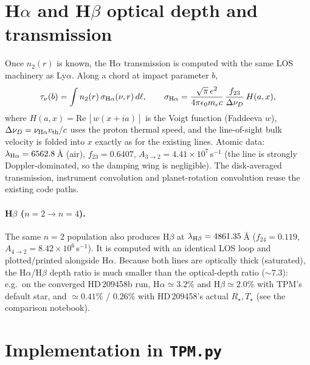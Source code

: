 \documentclass[english,a4paper]{kiseon_memo}
\begin{document}
\section{H$\alpha$ and H$\beta$ optical depth and transmission}

Once $n_2(r)$ is known, the H$\alpha$ transmission is computed with the
same LOS machinery as Ly$\alpha$. Along a chord at impact parameter $b$,
\[
  \tau_\nu(b) = \int n_2(r)\,\sigma_{\rm H\alpha}(\nu,r)\,d\ell,
  \qquad
  \sigma_{\rm H\alpha} = \frac{\sqrt{\pi}\,e^2}{4\pi\epsilon_0 m_e c}\,
  \frac{f_{23}}{\Delta\nu_D}\,H(a,x),
\]
where $H(a,x)=\mathrm{Re}\,[w(x+ia)]$ is the Voigt function (Faddeeva
$w$), $\Delta\nu_D=\nu_{\rm H\alpha}v_{\rm th}/c$ uses the proton thermal
speed, and the line-of-sight bulk velocity is folded into $x$ exactly as
for the existing lines. Atomic data: $\lambda_{\rm H\alpha}=6562.8\,$\AA{}
(air), $f_{23}=0.6407$, $A_{3\to2}=4.41\times10^{7}\,$s$^{-1}$ (the line
is strongly Doppler-dominated, so the damping wing is negligible). The
disk-averaged transmission, instrument convolution and planet-rotation
convolution reuse the existing code paths.

\paragraph{H$\beta$ ($n=2\to n=4$).} The same $n=2$ population also
produces H$\beta$ at $\lambda_{\rm H\beta}=4861.35\,$\AA{} ($f_{24}=0.119$,
$A_{4\to2}=8.42\times10^{6}\,$s$^{-1}$). It is computed with an identical
LOS loop and plotted/printed alongside H$\alpha$. Because both lines are
optically thick (saturated), the H$\alpha$/H$\beta$ depth ratio is much
smaller than the optical-depth ratio ($\sim7.3$): e.g.\ on the converged
HD\,209458b run, H$\alpha\simeq3.2\%$ and H$\beta\simeq2.0\%$ with TPM's
default star, and $\simeq0.41\%$ / $0.26\%$ with HD\,209458's actual
$R_\star,T_\star$ (see the comparison notebook).

\section{Implementation in \texttt{TPM.py}}
\end{document}
